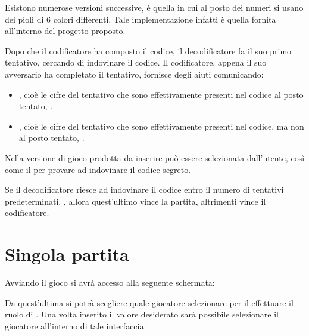 \documentclass[letterpaper,10pt,italian,openany,oneside]{sphinxmanual}
\begin{document}
Esistono numerose versioni successive,  è quella in cui al posto dei numeri si usano dei pioli di 6 colori differenti. Tale implementazione infatti è quella fornita all’interno del progetto proposto.

Dopo che il codificatore ha composto il codice, il decodificatore fa il suo primo tentativo, cercando di indovinare il codice. Il codificatore, appena il suo avversario ha completato il tentativo, fornisce degli aiuti comunicando:
\begin{itemize}
\item {} 
, cioè le cifre del tentativo che sono effettivamente presenti nel codice al posto tentato, .

\item {} 
, cioè le cifre del tentativo che sono effettivamente presenti nel codice, ma non al posto tentato, .

\end{itemize}

Nella versione di gioco prodotta  da inserire può essere selezionata dall’utente, così come il  per provare ad indovinare il codice segreto.

Se il decodificatore riesce ad indovinare il codice entro il numero di tentativi predeterminati, , allora quest’ultimo vince la partita, altrimenti vince il codificatore.


\section{Singola partita}
\label{\detokenize{gameguide:singola-partita}}
Avviando il gioco si avrà accesso alla seguente schermata:

\noindent{}

Da quest’ultima si potrà scegliere quale giocatore selezionare per il effettuare il ruolo di .
Una volta inserito il valore desiderato sarà possibile selezionare il giocatore  all’interno di tale interfaccia:

\noindent{}
\end{document}

